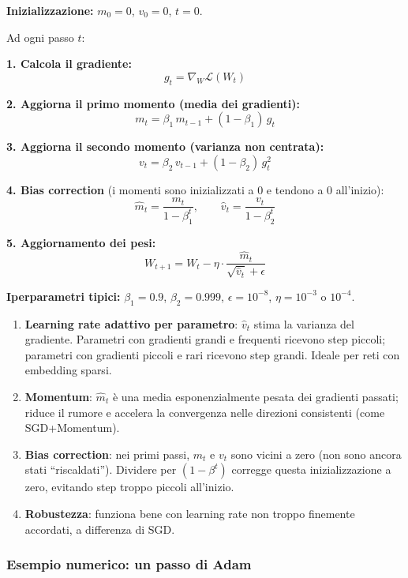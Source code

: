 \documentclass[
  11pt,
]{article}
\begin{document}
\begin{formulabox}[title={\textbf{Adam --- Algoritmo completo}}]
\textbf{Inizializzazione:} $m_0 = 0$, $v_0 = 0$, $t = 0$.

Ad ogni passo $t$:

\textbf{1. Calcola il gradiente:}
\[
g_t = \nabla_W \mathcal{L}(W_t)
\]

\textbf{2. Aggiorna il primo momento (media dei gradienti):}
\[
m_t = \beta_1\, m_{t-1} + (1 - \beta_1)\, g_t
\]

\textbf{3. Aggiorna il secondo momento (varianza non centrata):}
\[
v_t = \beta_2\, v_{t-1} + (1 - \beta_2)\, g_t^2
\]

\textbf{4. Bias correction} (i momenti sono inizializzati a 0 e tendono a 0 all'inizio):
\[
\hat{m}_t = \frac{m_t}{1 - \beta_1^t}, \qquad \hat{v}_t = \frac{v_t}{1 - \beta_2^t}
\]

\textbf{5. Aggiornamento dei pesi:}
\[
W_{t+1} = W_t - \eta \cdot \frac{\hat{m}_t}{\sqrt{\hat{v}_t} + \epsilon}
\]

\textbf{Iperparametri tipici:} $\beta_1 = 0.9$, $\beta_2 = 0.999$, $\epsilon = 10^{-8}$, $\eta = 10^{-3}$ o $10^{-4}$.
\end{formulabox}

\begin{notabox}[title={\textbf{Perché Adam funziona bene?}}]
\begin{enumerate}
  \item \textbf{Learning rate adattivo per parametro}: $\hat{v}_t$ stima la varianza del gradiente. Parametri con gradienti grandi e frequenti ricevono step piccoli; parametri con gradienti piccoli e rari ricevono step grandi. Ideale per reti con embedding sparsi.
  \item \textbf{Momentum}: $\hat{m}_t$ è una media esponenzialmente pesata dei gradienti passati; riduce il rumore e accelera la convergenza nelle direzioni consistenti (come SGD+Momentum).
  \item \textbf{Bias correction}: nei primi passi, $m_t$ e $v_t$ sono vicini a zero (non sono ancora stati ``riscaldati''). Dividere per $(1-\beta^t)$ corregge questa inizializzazione a zero, evitando step troppo piccoli all'inizio.
  \item \textbf{Robustezza}: funziona bene con learning rate non troppo finemente accordati, a differenza di SGD.
\end{enumerate}
\end{notabox}

\subsubsection*{Esempio numerico: un passo di Adam}
\end{document}
